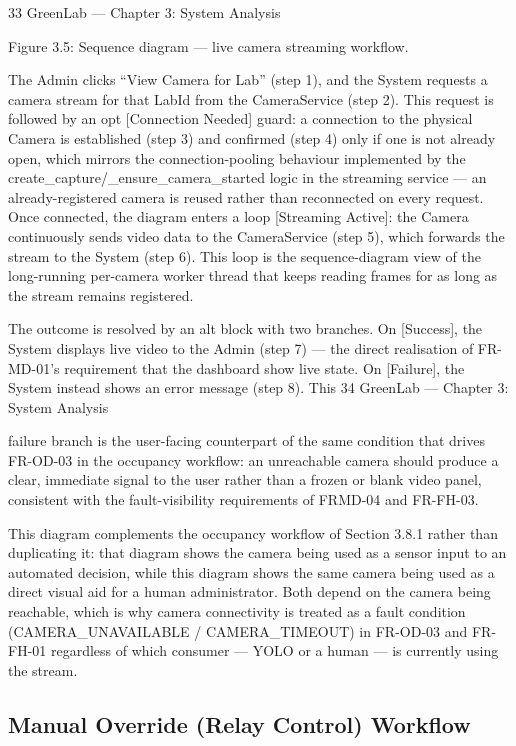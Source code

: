 33
GreenLab --- Chapter 3: System Analysis




Figure 3.5: Sequence diagram --- live camera streaming workflow.

The Admin clicks ``View Camera for Lab'' (step 1), and the System requests a camera stream for
that LabId from the CameraService (step 2). This request is followed by an opt [Connection
Needed] guard: a connection to the physical Camera is established (step 3) and confirmed (step 4)
only if one is not already open, which mirrors the connection-pooling behaviour implemented by
the create_capture/_ensure_camera_started logic in the streaming service --- an already-registered
camera is reused rather than reconnected on every request. Once connected, the diagram enters a
loop [Streaming Active]: the Camera continuously sends video data to the CameraService (step 5),
which forwards the stream to the System (step 6). This loop is the sequence-diagram view of the
long-running per-camera worker thread that keeps reading frames for as long as the stream remains
registered.

The outcome is resolved by an alt block with two branches. On [Success], the System displays live
video to the Admin (step 7) --- the direct realisation of FR-MD-01's requirement that the
dashboard show live state. On [Failure], the System instead shows an error message (step 8). This
34
GreenLab --- Chapter 3: System Analysis


failure branch is the user-facing counterpart of the same condition that drives FR-OD-03 in the
occupancy workflow: an unreachable camera should produce a clear, immediate signal to the user
rather than a frozen or blank video panel, consistent with the fault-visibility requirements of FRMD-04 and FR-FH-03.

This diagram complements the occupancy workflow of Section 3.8.1 rather than duplicating it: that
diagram shows the camera being used as a sensor input to an automated decision, while this
diagram shows the same camera being used as a direct visual aid for a human administrator. Both
depend on the camera being reachable, which is why camera connectivity is treated as a fault
condition (CAMERA_UNAVAILABLE / CAMERA_TIMEOUT) in FR-OD-03 and FR-FH-01
regardless of which consumer --- YOLO or a human --- is currently using the stream.

\subsection{Manual Override (Relay Control) Workflow}

